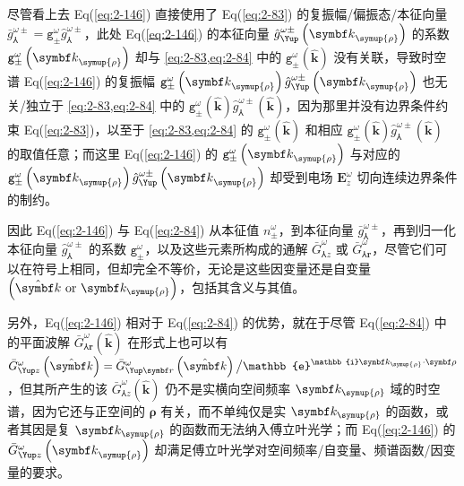 尽管看上去 Eq(\ref{eq:2-146}) 直接使用了 Eq(\ref{eq:2-83}) 的复振幅/偏振态/本征向量 $\bar{g}^{\omega\pm}_{\Yup} = {\mathtt{g}}^{\omega}_{\pm} \hat{g}^{\omega\pm}_{\Yup}$，此处 Eq(\ref{eq:2-146}) 的本征向量 $\hat{g}^{\omega\pm}_{\Yup} \left( {\symbf k}_{\symup{\rho}} \right)$ 的系数 ${\mathtt{g}}^{\omega}_{\pm} \left( {\symbf k}_{\symup{\rho}} \right)$ 却与 \cref{eq:2-83,eq:2-84} 中的 ${\mathtt{g}}^{\omega}_{\pm} \left( \hat{\symbf k} \right)$ 没有关联，导致时空谱 Eq(\ref{eq:2-146}) 的复振幅 ${\mathtt{g}}^{\omega}_{\pm} \left( {\symbf k}_{\symup{\rho}} \right) \hat{g}^{\omega\pm}_{\Yup} \left( {\symbf k}_{\symup{\rho}} \right)$ 也无关/独立于 \cref{eq:2-83,eq:2-84} 中的 ${\mathtt{g}}^{\omega}_{\pm} \left( \hat{\symbf k} \right) \hat{g}^{\omega\pm}_{\Yup} \left( \hat{\symbf k} \right)$，因为那里并没有边界条件约束 Eq(\ref{eq:2-83})，以至于 \cref{eq:2-83,eq:2-84} 的 ${\mathtt{g}}^{\omega}_{\pm} \left( \hat{\symbf k} \right)$ 和相应 ${\mathtt{g}}^{\omega}_{\pm} \left( \hat{\symbf k} \right) \hat{g}^{\omega\pm}_{\Yup} \left( \hat{\symbf k} \right)$ 的取值任意；而这里 Eq(\ref{eq:2-146}) 的 ${\mathtt{g}}^{\omega}_{\pm} \left( {\symbf k}_{\symup{\rho}} \right)$ 与对应的 ${\mathtt{g}}^{\omega}_{\pm} \left( {\symbf k}_{\symup{\rho}} \right) \hat{g}^{\omega\pm}_{\Yup} \left( {\symbf k}_{\symup{\rho}} \right)$ 却受到电场 $\symbf E^{\omega}_z$ 切向连续边界条件的制约。

因此 Eq(\ref{eq:2-146}) 与 Eq(\ref{eq:2-84}) 从本征值 $n^{\omega}_{\pm}$，到本征向量 $\bar{g}^{\omega\pm}_{\Yup}$，再到归一化本征向量 $\hat{g}^{\omega\pm}_{\Yup}$ 的系数 ${\mathtt{g}}^{\omega}_{\pm}$，以及这些元素所构成的通解 $\bar{G}^{\omega}_{\Yup z}$ 或 $\bar{G}^{\omega}_{\Yup \symbf r}$，尽管它们可以在符号上相同，但却完全不等价，无论是这些因变量还是自变量 $\left( \hat{\symbf k}\ \text{or}\ \symbf k_{\symup{\rho}} \right)$，包括其含义与其值。

另外，Eq(\ref{eq:2-146}) 相对于 Eq(\ref{eq:2-84}) 的优势，就在于尽管 Eq(\ref{eq:2-84}) 中的平面波解 $\bar{G}^{\omega}_{\Yup \symbf r} \left( \hat{\symbf k} \right)$ 在形式上也可以有 $\bar{G}^{\omega}_{\Yup z} \left( \hat{\symbf k} \right) = \bar{G}^{\omega}_{\Yup \symbf r} \left( \hat{\symbf k} \right) \big/ \mathbb{e}^{\mathbb{i} \symbf k_{\symup{\rho}} \cdot {\symbf \rho}}$，但其所产生的该 $\bar{G}^{\omega}_{\Yup z} \left( \hat{\symbf k} \right)$ 仍不是实横向空间频率 $\symbf k_{\symup{\rho}}$ 域的时空谱，因为它还与正空间的 $\symbf \rho$ 有关，而不单纯仅是实 $\symbf k_{\symup{\rho}}$ 的函数，或者其因是复 $\symbf k_{\symup{\rho}}$ 的函数而无法纳入傅立叶光学；而 Eq(\ref{eq:2-146}) 的 $\bar{G}^{\omega}_{\Yup z} \left( {\symbf k}_{\symup{\rho}} \right)$ 却满足傅立叶光学对空间频率/自变量、频谱函数/因变量的要求。

